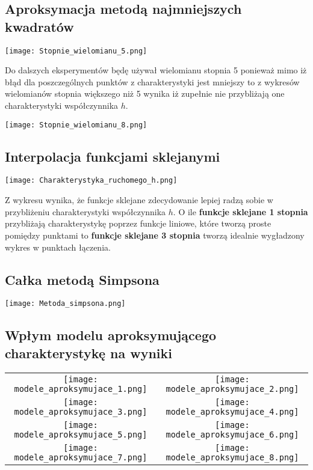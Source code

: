 \documentclass[varwidth,12pt,a4paper]{article}
\begin{document}
\subsection{Aproksymacja metodą najmniejszych kwadratów}

\texttt{[image: Stopnie\_wielomianu\_5.png]} 

Do dalszych eksperymentów będę używał wielomianu stopnia 5 ponieważ 
mimo iż błąd dla poszczególnych punktów z charakterystyki jest mniejszy to 
z wykresów wielomianów stopnia większego niż 5 wynika iż zupełnie nie przybliżają
one charakterystyki współczynnika $h$.


\texttt{[image: Stopnie\_wielomianu\_8.png]} 

\subsection{Interpolacja funkcjami sklejanymi}

\texttt{[image: Charakterystyka\_ruchomego\_h.png]} 

Z wykresu wynika, że funkcje sklejane zdecydowanie lepiej radzą sobie w przybliżeniu charakterystyki
współczynnika $h$. O ile \textbf{funkcje sklejane 1 stopnia} przybliżają charakterystykę poprzez funkcje
liniowe, które tworzą proste pomiędzy punktami to \textbf{funkcje sklejane 3 stopnia} tworzą idealnie
wygładzony wykres w punktach łączenia.

\subsection{Całka metodą Simpsona}

\texttt{[image: Metoda\_simpsona.png]} 

\subsection{Wpłym modelu aproksymującego charakterystykę na wyniki}

\begin{tabular}{cc}
    \texttt{[image: modele\_aproksymujace\_1.png]} &
    \texttt{[image: modele\_aproksymujace\_2.png]} \\
    \texttt{[image: modele\_aproksymujace\_3.png]} &
    \texttt{[image: modele\_aproksymujace\_4.png]} \\
    \texttt{[image: modele\_aproksymujace\_5.png]} &
    \texttt{[image: modele\_aproksymujace\_6.png]} \\
    \texttt{[image: modele\_aproksymujace\_7.png]} &
    \texttt{[image: modele\_aproksymujace\_8.png]} 
\end{tabular}
\end{document}
